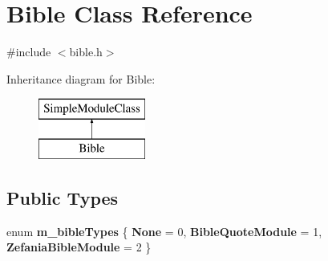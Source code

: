 \hypertarget{classBible}{
\section{Bible Class Reference}
\label{classBible}
}


{\ttfamily \#include $<$bible.h$>$}

Inheritance diagram for Bible:\begin{figure}[H]
\begin{center}
\leavevmode
\includegraphics[height=2cm]{classBible}
\end{center}
\end{figure}
\subsection*{Public Types}
\begin{DoxyCompactItemize}
\item 
enum {\bfseries m\_\-bibleTypes} \{ {\bfseries None} =  0, 
{\bfseries BibleQuoteModule} =  1, 
{\bfseries ZefaniaBibleModule} =  2
 \}
\end{DoxyCompactItemize}
